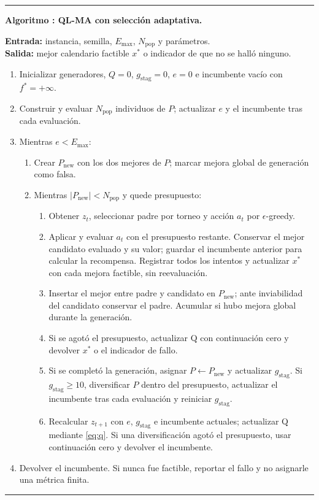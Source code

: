 \documentclass[11pt,a4paper]{article}
\newcommand{\Emax}{E_{\max}}
\newcommand{\gstag}{g_{\mathrm{stag}}}
\newcounter{algorithm}
\begin{document}
\begin{center}
\begin{minipage}{0.96\linewidth}\small
\hrule\smallskip
{}\textbf{Algoritmo \thealgorithm: QL-MA con selección adaptativa.}\par
\label{alg:qlma}
\textbf{Entrada:} instancia, semilla, $\Emax$, $N_{\mathrm{pop}}$ y parámetros.\\
\textbf{Salida:} mejor calendario factible $x^*$ o indicador de que no se halló ninguno.
\begin{enumerate}[label=\arabic*.,leftmargin=1.8em]
\item Inicializar generadores, $Q=0$, $\gstag=0$, $e=0$ e incumbente vacío con $f^*=+\infty$.
\item Construir y evaluar $N_{\mathrm{pop}}$ individuos de $P$; actualizar $e$ y el incumbente tras cada evaluación.
\item Mientras $e<\Emax$:
\begin{enumerate}[label=\alph*.,leftmargin=1.5em]
\item Crear $P_{\mathrm{new}}$ con los dos mejores de $P$; marcar mejora global de generación como falsa.
\item Mientras $|P_{\mathrm{new}}|<N_{\mathrm{pop}}$ y quede presupuesto:
\begin{enumerate}[label=\roman*.,leftmargin=1.5em]
\item Obtener $z_t$, seleccionar padre por torneo y acción $a_t$ por $\epsilon$-greedy.
\item Aplicar y evaluar $a_t$ con el presupuesto restante. Conservar el mejor candidato evaluado y su valor; guardar el incumbente anterior para calcular la recompensa. Registrar todos los intentos y actualizar $x^*$ con cada mejora factible, sin reevaluación.
\item Insertar el mejor entre padre y candidato en $P_{\mathrm{new}}$; ante inviabilidad del candidato conservar el padre. Acumular si hubo mejora global durante la generación.
\item Si se agotó el presupuesto, actualizar Q con continuación cero y devolver $x^*$ o el indicador de fallo.
\item Si se completó la generación, asignar $P\leftarrow P_{\mathrm{new}}$ y actualizar $\gstag$. Si $\gstag\geq10$, diversificar $P$ dentro del presupuesto, actualizar el incumbente tras cada evaluación y reiniciar $\gstag$.
\item Recalcular $z_{t+1}$ con $e$, $\gstag$ e incumbente actuales; actualizar Q mediante \eqref{eq:q}. Si una diversificación agotó el presupuesto, usar continuación cero y devolver el incumbente.
\end{enumerate}
\end{enumerate}
\item Devolver el incumbente. Si nunca fue factible, reportar el fallo y no asignarle una métrica finita.
\end{enumerate}
\smallskip\hrule
\end{minipage}
\end{center}
\end{document}
